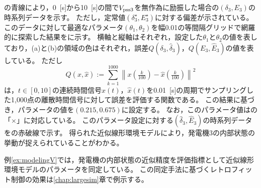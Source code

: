 \documentclass[tombow,dvipdfmx]{corona-a5-1.1}
\begin{document}
\begin{例}[計測データに基づく近似線形環境モデルの同定]
の青線により，0~[s]から10~[s]の間で$V_{{\rm pss}3}$を無作為に励振した場合の$(\delta_3,E_3)$の時系列データを示す。
ただし，定常値$(\delta_3^{\star},E_3^{\star})$に対する偏差が示されている。
このデータに対して最適なパラメータ$(\theta_1,\theta_2)$を幅0.01の等間隔グリッドで網羅的に探索した結果をに示す。
横軸と縦軸はそれぞれ，設定した$\theta_1$と$\theta_2$の値を表しており，(a)と(b)の領域の色はそれぞれ，誤差$Q(\delta_3,\hat{\delta}_3)$，$Q(E_3,\hat{E}_3)$の値を表している。
ただし
\[
Q(x,\hat{x}):=
\sum_{k=1}^{1000}
\left\|
x\left(
\tfrac{k}{100}
\right)
-
\hat{x}\left(
\tfrac{k}{100}
\right)
\right\|^2
\]
は，$t\in [0,10]$の連続時間信号$x(t)$，$\hat{x}(t)$を0.01~[s]の周期でサンプリングした1,000点の離散時間信号に対して誤差を評価する関数である。
この結果に基づき，パラメータの値を$(0.215,0.675)$に設定する。
なお，このパラメータ値はの「$\times$」に対応している。
このパラメータ設定に対する$(\hat{\delta}_3,\hat{E}_3)$の時系列データをの赤破線で示す。
得られた近似線形環境モデルにより，発電機3の内部状態の挙動が捉えられていることがわかる。
\end{例}


例\ref{ex:modelingV}では，発電機の内部状態の近似精度を評価指標として近似線形環境モデルのパラメータを同定している。
この同定手法に基づくレトロフィット制御の効果は\ref{chap:largesim}章で例示する。



\newpage
%
%
\end{document}
